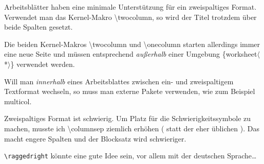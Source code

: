 \documentclass[hyperworksheet]{drcschool}
\newcommand*{\cs}[1]{\textup{\ttfamily\textbackslash#1}}                   %
\newcommand*{\pkg}[1]{\textup{\ttfamily#1}}                                %
\newcommand*{\opt}[1]{\textup{\ttfamily#1}}                                %
\newcommand*{\env}[1]{\textup{\ttfamily\{#1\}}}                            %
\newcommand*{\optstar}{\mbox{\ttfamily$\langle$*$\rangle$}}                %
\begin{document}
\twocolumn

\begin{worksheet*}
Arbeitsblätter haben eine minimale Unterstützung für ein zweispaltiges Format.
Verwendet man das Kernel-Makro \cs{twocolumn}, so wird der Titel trotzdem über
beide Spalten gesetzt.

Die beiden Kernel-Makros \cs{twocolumn} und \cs{onecolumn} starten
allerdings immer eine neue Seite und müssen entsprechend \emph{außerhalb}
einer Umgebung \env{worksheet\optstar} verwendet werden.

Will man \emph{innerhalb} eines Arbeitsblattes zwischen ein- und zweispaltigem
Textformat wechseln, so muss man externe Pakete verwenden, wie zum Beispiel
\pkg{multicol}.

\medium\exercise[Foo]
\lipsum[1-3]

\easy\exercise
Zweispaltiges Format ist schwierig. Um Platz für die Schwierigkeitssymbole
zu machen, musste ich \cs{columnsep} ziemlich erhöhen (\opt{24pt} statt der
eher üblichen \opt{10pt}). Das macht engere Spalten und der Blocksatz
wird schwieriger.

\verb=\raggedright= könnte eine gute Idee sein, vor allem mit der deutschen Sprache\ldots

\end{worksheet*}

\onecolumn

\end{document}
